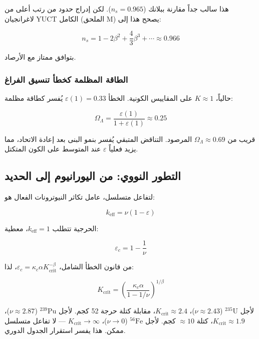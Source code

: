 \documentclass[11pt,a4paper]{article}
\newcommand{\kappac}{\kappa_c}
\newcommand{\eps}{\varepsilon}
\begin{document}
	هذا سالب جداً مقارنة ببلانك (\(n_s = 0.965\)). لكن إدراج حدود من رتب أعلى من لاغرانجيان YUCT الكامل (الملحق M) يصحح هذا إلى:
	
	\begin{equation}
		n_s = 1 - 2\beta^2 + \frac{4}{3}\beta^3 + \cdots \approx 0.966
		\label{eq:ns-correct}
	\end{equation}
	
	بتوافق ممتاز مع الأرصاد.
	
	\subsubsection{الطاقة المظلمة كخطأ تنسيق الفراغ}
	
	حالياً، \(K \approx 1\) على المقاييس الكونية. الخطأ \(\eps(1) = 0.33\) يُفسر كطاقة مظلمة:
	
	\begin{equation}
		\Omega_{\Lambda} = \frac{\eps(1)}{1 + \eps(1)} \approx 0.25
		\label{eq:omega-lambda}
	\end{equation}
	
	قريب من \(\Omega_{\Lambda} \approx 0.69\) المرصود. التناقض المتبقي يُفسر بنمو البنى بعد إعادة الاتحاد، مما يزيد فعلياً \(\eps\) عند المتوسط على الكون المتكتل.
	
	\subsection{التطور النووي: من اليورانيوم إلى الحديد}
	\label{subsec:nuclear}
	
	لتفاعل متسلسل، عامل تكاثر النيوترونات الفعال هو:
	
	\begin{equation}
		k_{\text{eff}} = \nu (1 - \eps)
		\label{eq:keff-nuclear}
	\end{equation}
	
	الحرجية تتطلب \(k_{\text{eff}} = 1\)، معطية:
	
	\begin{equation}
		\eps_c = 1 - \frac{1}{\nu}
		\label{eq:eps-c-nuclear}
	\end{equation}
	
	من قانون الخطأ الشامل، \(\eps_c = \kappac \alpha K_{\text{crit}}^{-\beta}\)، لذا:
	
	\begin{equation}
		K_{\text{crit}} = \left( \frac{\kappac \alpha}{1 - 1/\nu} \right)^{1/\beta}
		\label{eq:Kcrit-nuclear}
	\end{equation}
	
	لأجل \(^{235}\text{U}\) (\(\nu \approx 2.43\))، \(K_{\text{crit}} \approx 2.4\)، مقابلة كتلة حرجة 52 كجم. لأجل \(^{239}\text{Pu}\) (\(\nu \approx 2.87\))، \(K_{\text{crit}} \approx 1.9\)، كتلة \(\approx 10\) كجم. لأجل \(^{56}\text{Fe}\) (\(\nu \to 0\))، \(K_{\text{crit}} \to \infty\) — لا تفاعل متسلسل ممكن. هذا يفسر استقرار الجدول الدوري.
	
\end{document}
